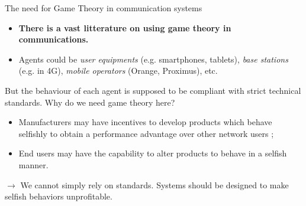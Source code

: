 \usetikzlibrary{calc}
\usetikzlibrary{decorations.pathreplacing,decorations.markings,shapes.geometric}

\newcommand{\BS}[1]{%
	\begin{tikzpicture}
		\node[station] (base) {#1};
		\draw[line join=bevel] (base.100) -- (base.80) -- (base.110) -- (base.70) -- (base.north west)
        -- (base.north east);
		\draw[line join=bevel] (base.100) -- (base.70) (base.110) -- (base.north east);
		\draw[line cap=rect] ([yshift=0pt]base.north) [antenna=1];
	\end{tikzpicture}
}

\newcommand{\UE}[1]{%
	\begin{tikzpicture}
        \node (ue) {$\underset{#1}{\smartphone}$};
	\end{tikzpicture}
}

\begin{frame}{The need for Game Theory in communication systems}
    \begin{itemize}
        \item \textbf{There is a vast litterature on using game theory in communications.}
        \item Agents could be \textit{user equipments} (e.g. smartphones, tablets),
        \textit{base stations} (e.g. in 4G), \textit{mobile operators} (Orange, Proximus), etc.
    \end{itemize}

    \pause
    \begin{alertblock}{But the behaviour of each agent is supposed to be compliant with strict
    technical standards. Why do we need game theory here?}
        \begin{itemize}
            \pause
            \item Manufacturers may have incentives to develop products which behave selfishly
            to obtain a performance advantage over other network users ;
            \pause
            \item End users may have the capability to alter products to behave in a selfish
            manner.
        \end{itemize}
    \end{alertblock}

    \pause
    $\to$ We cannot simply rely on standards. {\color{green}Systems should be designed to
    make selfish behaviors unprofitable.}
\end{frame}

